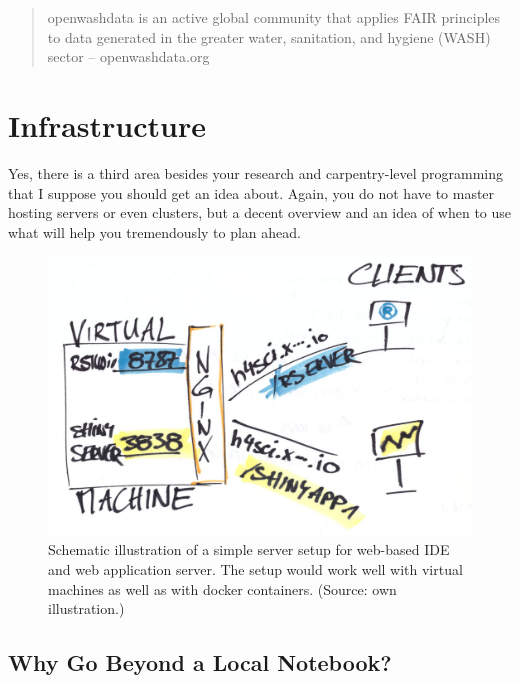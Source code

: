 \documentclass[
  12pt,
  letterpaper,
]{krantz}
\begin{document}
\begin{quote}
openwashdata is an active global community that applies FAIR
principles to data generated in the greater
water, sanitation, and hygiene (WASH) sector -- openwashdata.org
\end{quote}


\hypertarget{infrastructure-1}{%
\chapter{Infrastructure}\label{infrastructure-1}}

Yes, there is a third area besides your research and carpentry-level
programming that I suppose you should get an idea about. Again, you do
not have to master hosting servers or even clusters, but a decent
overview and an idea of when to use what will help you tremendously to
plan ahead.

\begin{figure}

{\centering \includegraphics{./images/server-setup3.jpg}

}

\caption{Schematic illustration of a simple server setup for web-based
IDE and web application server. The setup would work well with virtual
machines as well as with docker containers. (Source: own
illustration.)}

\end{figure}

\hypertarget{why-go-beyond-a-local-notebook}{%
\section{Why Go Beyond a Local
Notebook?}\label{why-go-beyond-a-local-notebook}}
\end{document}
